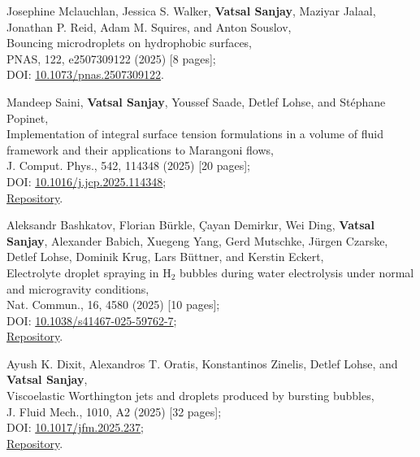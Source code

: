 \documentclass[10pt,a4paper,colorlinks,linkcolor=blue,urlcolor=blue,citecolor=blue]{moderncv}
\begin{document}
\begin{enumerate}[leftmargin=1.5em,label=\textbf{[\arabic*]}]
	\item Josephine Mclauchlan, Jessica S. Walker, \textbf{Vatsal Sanjay}, Maziyar Jalaal, Jonathan P. Reid, Adam M. Squires, and Anton Souslov,\\
	Bouncing microdroplets on hydrophobic surfaces,\\
	PNAS, 122, e2507309122 (2025) [8 pages];\\
	\faFile\hspace{0.2em}DOI: \href{https://doi.org/10.1073/pnas.2507309122}{10.1073/pnas.2507309122}.

	\item Mandeep Saini, \textbf{Vatsal Sanjay}, Youssef Saade, Detlef Lohse, and Stéphane Popinet,\\
	Implementation of integral surface tension formulations in a volume of fluid framework and their applications to Marangoni flows,\\
	J. Comput. Phys., 542, 114348 (2025) [20 pages];\\
	\faFile\hspace{0.2em}DOI: \href{https://doi.org/10.1016/j.jcp.2025.114348}{10.1016/j.jcp.2025.114348};\\
	\faGithub\hspace{0.2em}\href{https://github.com/comphy-lab/marangoniSheet}{Repository}.

	\item Aleksandr Bashkatov, Florian Bürkle, Çayan Demirkır, Wei Ding, \textbf{Vatsal Sanjay}, Alexander Babich, Xuegeng Yang, Gerd Mutschke, Jürgen Czarske, Detlef Lohse, Dominik Krug, Lars Büttner, and Kerstin Eckert,\\
	Electrolyte droplet spraying in H$_2$ bubbles during water electrolysis under normal and microgravity conditions,\\
	Nat. Commun., 16, 4580 (2025) [10 pages];\\
	\faFile\hspace{0.2em}DOI: \href{https://doi.org/10.1038/s41467-025-59762-7}{10.1038/s41467-025-59762-7};\\
	\faGithub\hspace{0.2em}\href{https://github.com/VatsalSy/Asymmetries-in-coalescence}{Repository}.

	\item Ayush K. Dixit, Alexandros T. Oratis, Konstantinos Zinelis, Detlef Lohse, and \textbf{Vatsal Sanjay},\\
	Viscoelastic Worthington jets and droplets produced by bursting bubbles,\\
	J. Fluid Mech., 1010, A2 (2025) [32 pages];\\
	\faFile\hspace{0.2em}DOI: \href{https://doi.org/10.1017/jfm.2025.237}{10.1017/jfm.2025.237};\\
	\faGithub\hspace{0.2em}\href{https://github.com/comphy-lab/Viscoelastic-Worthington-jets-and-droplets-produced-by-bursting-bubbles}{Repository}.


\end{enumerate}
\end{document}
